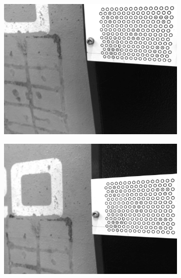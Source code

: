 \begin{figure}[h]
\begin{subfigure}{0.32\textwidth}
    \end{subfigure}
    \vspace{0.1cm}
    \begin{subfigure}{0.32\textwidth}
        \centering
        \includegraphics[width=\textwidth]{figures/001calibration/calibration2.PNG}
    \end{subfigure}
    \vspace{0.1cm}
    \begin{subfigure}{0.32\textwidth}
        \centering
        \includegraphics[width=\textwidth]{figures/001calibration/calibration3.png}
    \end{subfigure}\hspace{0cm}
    \begin{subfigure}{0.32\textwidth}

\end{subfigure}
\end{figure}
